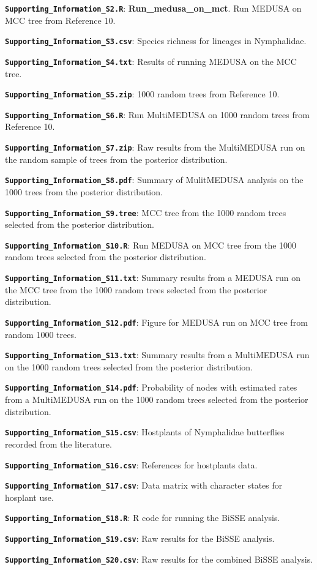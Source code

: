 \documentclass[10pt]{article}
\begin{document}
\textbf{\texttt{Supporting_Information_S2.R}}: \textbf{Run_medusa_on_mct}. Run MEDUSA on
MCC tree from Reference 10.

\textbf{\texttt{Supporting\_Information\_S3.csv}}: Species richness for
lineages in Nymphalidae.

\textbf{\texttt{Supporting\_Information\_S4.txt}}: Results of running
MEDUSA on the MCC tree.

\textbf{\texttt{Supporting\_Information\_S5.zip}}: 1000 random trees from Reference 10.

\textbf{\texttt{Supporting\_Information\_S6.R}}: Run MultiMEDUSA on
1000 random trees from Reference 10.

\textbf{\texttt{Supporting\_Information\_S7.zip}}: Raw
results from the MultiMEDUSA run on the random sample of trees from the
posterior distribution.

\textbf{\texttt{Supporting\_Information\_S8.pdf}}: Summary of
MulitMEDUSA analysis on the 1000 trees from the posterior distribution.

\textbf{\texttt{Supporting\_Information\_S9.tree}}:
MCC tree from the 1000 random trees selected from the posterior
distribution.

\textbf{\texttt{Supporting_Information_S10.R}}:
Run MEDUSA on MCC tree from the 1000 random trees selected from the
posterior distribution.

\textbf{\texttt{Supporting_Information_S11.txt}}:
Summary results from a MEDUSA run on the MCC tree from the 1000 random
trees selected from the posterior distribution.

\textbf{\texttt{Supporting_Information_S12.pdf}}:
Figure for MEDUSA run on MCC tree from random 1000 trees.

\textbf{\texttt{Supporting_Information_S13.txt}}:
Summary results from a MultiMEDUSA run on the 1000 random trees selected
from the posterior distribution.

\textbf{\texttt{Supporting_Information_S14.pdf}}:
Probability of nodes with estimated rates from a MultiMEDUSA run on the
1000 random trees selected from the posterior distribution.

\textbf{\texttt{Supporting_Information_S15.csv}}: Hostplants of
Nymphalidae butterflies recorded from the literature.

\textbf{\texttt{Supporting_Information_S16.csv}}:
References for hostplants data.

\textbf{\texttt{Supporting_Information_S17.csv}}: Data matrix with
character states for hosplant use.

\textbf{\texttt{Supporting_Information_S18.R}}: R code for running the
BiSSE analysis.

\textbf{\texttt{Supporting_Information_S19.csv}}: Raw results for
the BiSSE analysis.

\textbf{\texttt{Supporting_Information_S20.csv}}: Raw results for
the combined BiSSE analysis.
\end{document}
